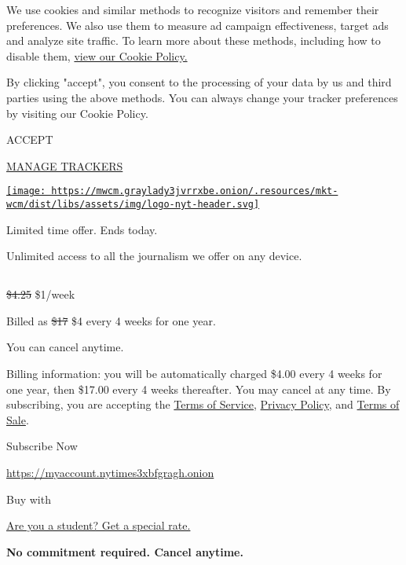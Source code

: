 We use cookies and similar methods to recognize visitors and remember
their preferences. We also use them to measure ad campaign
effectiveness, target ads and analyze site traffic. To learn more about
these methods, including how to disable them,
\href{https://nytimes3xbfgragh.onion/cookie-policy}{view our Cookie
Policy.}

By clicking "accept", you consent to the processing of your data by us
and third parties using the above methods. You can always change your
tracker preferences by visiting our Cookie Policy.

ACCEPT

\href{https://nytimes3xbfgragh.onion/cookie-policy}{MANAGE TRACKERS}

\href{https://www.nytimes3xbfgragh.onion/}{\texttt{[image: https://mwcm.graylady3jvrrxbe.onion/.resources/mkt-wcm/dist/libs/assets/img/logo-nyt-header.svg]}}

Limited time offer. Ends today.

Unlimited access to all the journalism we offer on any device.

\subsection{}

\sout{\$4.25} \$1/week

Billed as \sout{\$17} \$4 every 4 weeks for one year.

You can cancel anytime.

Billing information: you will be automatically charged \$4.00 every 4
weeks for one year, then \$17.00 every 4 weeks thereafter. You may
cancel at any time. By subscribing, you are accepting the
\href{https://www.nytimes3xbfgragh.onion/content/help/rights/terms/terms-of-service.html}{Terms
of Service},
\href{https://www.nytimes3xbfgragh.onion/content/help/rights/privacy/policy/privacy-policy.html}{Privacy
Policy}, and
\href{https://www.nytimes3xbfgragh.onion/content/help/rights/sale/terms-of-sale.html}{Terms
of Sale}.

\href{https://myaccount.nytimes3xbfgragh.onion/get-started?OC=20000216880\&campaignId=37WXW}{}

Subscribe Now

\url{https://myaccount.nytimes3xbfgragh.onion}

Buy with

\href{/subscription/education?campaignId=6JQ7F}{Are you a student? Get a
special rate. }

\textbf{No commitment required. Cancel anytime.}


